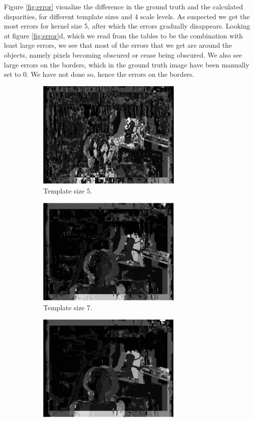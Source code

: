 \documentclass[12pt,a4paper,oneside,final]{article}
\begin{document}
Figure \ref{fig:error} visualize the difference in the ground truth and the calculated disparities, for different template sizes and 4 scale levels. As suspected we get the most errors for kernel size 5, after which the errors gradually disappears. Looking at figure \ref{fig:error}d, which we read from the tables to be the combination with least large errors, we see that most of the errors that we get are around the objects, namely pixels becoming obscured or cease being obscured. We also see large errors on the borders, which in the ground truth image have been manually set to 0. We have not done so, hence the errors on the borders.

\begin{figure}[H]
	\centering
	\begin{subfigure}[b]{0.5\textwidth}
		\centering
		\includegraphics[width=7cm]{errk5.png}
		\caption{Template size 5.}
	\end{subfigure}%
	\begin{subfigure}[b]{0.5\textwidth}
		\centering
		\includegraphics[width=7cm]{errk7.png}
		\caption{Template size 7.}
	\end{subfigure}
	\begin{subfigure}[b]{0.5\textwidth}
		\centering
		\includegraphics[width=7cm]{errk9.png}

\end{subfigure}
\end{figure}
\end{document}
